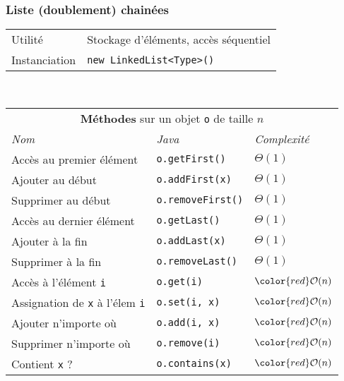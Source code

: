 \documentclass[8pt,aspectratio=169]{beamer}
\begin{document}
\begin{frame}
\frametitle{Liste (doublement) chainées}
\centering
\begin{tabular}{ll}
	Utilité & Stockage d'éléments, accès séquentiel\\
	Instanciation & \texttt{new LinkedList<Type>()}\\
\end{tabular}\\
\vspace{0.5cm}
\centering
\begin{tabular}{lll}
	\multicolumn{3}{c}{\textbf{Méthodes} sur un objet \texttt{o} de taille $n$} \\
	\textit{Nom} & \textit{Java} & \textit{Complexité} \\
	Accès au premier élément & \texttt{o.getFirst()} & $\Theta(1)$\\
	Ajouter au début & \texttt{o.addFirst(x)} & $\Theta(1)$\\
	Supprimer au début & \texttt{o.removeFirst()} & $\Theta(1)$\\
	Accès au dernier élément & \texttt{o.getLast()} & $\Theta(1)$\\
	Ajouter à la fin & \texttt{o.addLast(x)} & $\Theta(1)$\\
	Supprimer à la fin & \texttt{o.removeLast()} & $\Theta(1)$\\
	Accès à l'élément \texttt{i} & \texttt{o.get(i)} & $\color{red}\mathcal{O}(n)$\\
	Assignation de \texttt{x} à l'élem \texttt{i} & \texttt{o.set(i, x)} & $\color{red}\mathcal{O}(n)$\\
	Ajouter n'importe où & \texttt{o.add(i, x)} & $\color{red}\mathcal{O}(n)$\\
	Supprimer n'importe où & \texttt{o.remove(i)} & $\color{red}\mathcal{O}(n)$\\
	Contient \texttt{x} ? & \texttt{o.contains(x)} & $\color{red}\mathcal{O}(n)$\\
\end{tabular}
\end{frame}
\end{document}

